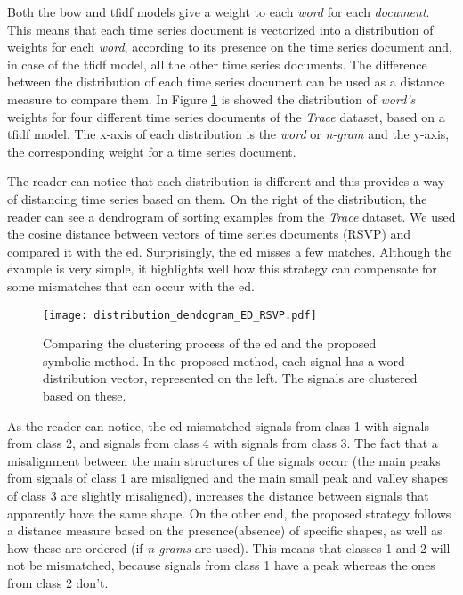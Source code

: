 Both the \gls{bow} and \gls{tfidf} models give a weight to each \textit{word} for each \textit{document}. This means that each time series document is vectorized into a distribution of weights for each \textit{word}, according to its presence on the time series document and, in case of the \gls{tfidf} model, all the other time series documents. The difference between the distribution of each time series document can be used as a distance measure to compare them. In Figure \ref{fig:distribution_dendogram} is showed the distribution of \textit{word's} weights for four different time series documents of the \textit{Trace} dataset, based on a \gls{tfidf} model. The x-axis of each distribution is the \textit{word} or \textit{n-gram} and the y-axis, the corresponding weight for a time series document.
\par
The reader can notice that each distribution is different and this provides a way of distancing time series based on them. On the right of the distribution, the reader can see a dendrogram of sorting examples from the \textit{Trace} dataset. We used the cosine distance between vectors of time series documents (RSVP) and compared it with the \gls{ed}. Surprisingly, the \gls{ed} misses a few matches. Although the example is very simple, it highlights well how this strategy can compensate for some mismatches that can occur with the \gls{ed}.

\begin{figure}
    \centering
    \texttt{[image: distribution\_dendogram\_ED\_RSVP.pdf]}
    \caption{Comparing the clustering process of the \gls{ed} and the proposed symbolic method. In the proposed method, each signal has a word distribution vector, represented on the left. The signals are clustered based on these.}
    \label{fig:distribution_dendogram}
\end{figure}
 
As the reader can notice, the \gls{ed} mismatched signals from class 1 with signals from class 2, and signals from class 4 with signals from class 3. The fact that a misalignment between the main structures of the signals occur (the main peaks from signals of class 1 are misaligned and the main small peak and valley shapes of class 3 are slightly misaligned), increases the distance between signals that apparently have the same shape. On the other end, the proposed strategy follows a distance measure based on the presence(absence) of specific shapes, as well as how these are ordered (if \textit{n-grams} are used). This means that classes 1 and 2 will not be mismatched, because signals from class 1 have a peak whereas the ones from class 2 don't.

